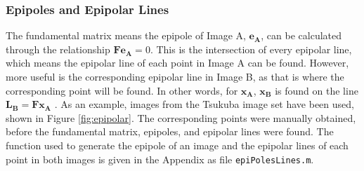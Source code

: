 \documentclass[a4paper, 10pt, conference]{ieeeconf}
\begin{document}
\subsubsection{Epipoles and Epipolar Lines}
The fundamental matrix means the epipole of Image A, $\textbf{e}_\textbf{A}$, can be calculated through the relationship $\textbf{Fe}_\textbf{A} = 0$. This is the intersection of every epipolar line, which means the epipolar line of each point in Image A can be found. However, more useful is the corresponding epipolar line in Image B, as that is where the corresponding point will be found. In other words, for $\textbf{x}_\textbf{A}$, $\textbf{x}_\textbf{B}$ is found on the line $\textbf{L}_\textbf{B}=\textbf{Fx}_\textbf{A}$ \cite{mit}. As an example, images from the Tsukuba image set \cite{tsukuba} have been used, shown in Figure \ref{fig:epipolar}. The corresponding points were manually obtained, before the fundamental matrix, epipoles, and epipolar lines were found. The function used to generate the epipole of an image and the epipolar lines of each point in both images is given in the Appendix as file \texttt{epiPolesLines.m}.
\end{document}
